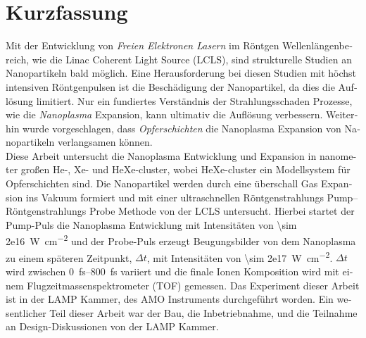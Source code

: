 \section*{Kurzfassung}
\begin{otherlanguage}{german}
Mit der Entwicklung von \textit{Freien Elektronen Lasern} im Röntgen Wellenlängenbereich, wie die Linac Coherent Light Source (LCLS), sind strukturelle Studien an Nanopartikeln bald möglich. Eine Herausforderung bei diesen Studien mit höchst intensiven Röntgenpulsen ist die Beschädigung der Nanopartikel, da dies die Auflösung limitiert. Nur ein fundiertes Verständnis der Strahlungsschaden Prozesse, wie die \textit{Nanoplasma} Expansion, kann ultimativ die Auflösung verbessern. Weiterhin wurde vorgeschlagen, dass \textit{Opferschichten} die Nanoplasma Expansion von Nanopartikeln verlangsamen können.\\[0.4\baselineskip]
%
Diese Arbeit untersucht die Nanoplasma Entwicklung und Expansion in nanometer großen He-, Xe- und HeXe-cluster, wobei HeXe-cluster ein Modellsystem für Opferschichten sind. Die Nanopartikel werden durch eine überschall Gas Expansion ins Vakuum formiert und mit einer ultraschnellen Röntgenstrahlungs Pump--Röntgenstrahlungs Probe Methode von der LCLS untersucht. Hierbei startet der Pump-Puls die Nanoplasma Entwicklung mit Intensitäten von \SI{\sim 2e16}{\watt\per\square\centi\meter} und der Probe-Puls erzeugt Beugungsbilder von dem Nanoplasma zu einem späteren Zeitpunkt, $\Delta t$, mit Intensitäten von \SI{\sim 2e17}{\watt\per\square\centi\meter}. $\Delta t$ wird zwischen \SIrange{0}{800}{\femto\second} variiert und die finale Ionen Komposition wird mit einem Flugzeitmassenspektrometer (TOF) gemessen. Das Experiment dieser Arbeit ist in der LAMP Kammer, des AMO Instruments durchgeführt worden. Ein wesentlicher Teil dieser Arbeit war der Bau, die Inbetriebnahme, und die Teilnahme an Design-Diskussionen von der LAMP Kammer.\\[0.4\baselineskip]
%

\end{otherlanguage}
